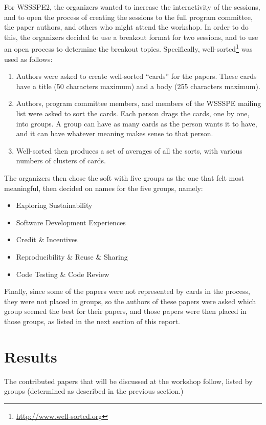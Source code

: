 \documentclass[11pt, oneside]{amsart}
\begin{document}
For WSSSPE2, the organizers wanted to increase the interactivity of the sessions, and to open the process of creating the sessions to the full program committee, the paper authors, and others who might attend the workshop.  In order to do this, the organizers decided to use a breakout format for two sessions, and to use an open process to determine the breakout topics.  Specifically, well-sorted\footnote{\url{http://www.well-sorted.org}} was used as follows:
\begin{enumerate}
\item Authors were asked to create well-sorted ``cards'' for the papers.  These cards have a title (50 characters maximum) and a body (255 characters maximum).
\item Authors, program committee members, and members of the WSSSPE mailing list were asked to sort the cards.  Each person drags the cards, one by one, into groups.  A group can have as many cards as the person wants it to have, and it can have whatever meaning makes sense to that person.
\item Well-sorted then produces a set of averages of all the sorts, with various numbers of clusters of cards.
\end{enumerate}

The organizers then chose the soft with five groups as the one that felt most meaningful, then decided on names for the five groups, namely:
\begin{itemize}
\item Exploring Sustainability
\item Software Development Experiences
\item Credit \& Incentives
\item Reproducibility \& Reuse \& Sharing
\item Code Testing \& Code Review
\end{itemize}

Finally, since some of the papers were not represented by cards in the process, they were not placed in groups, so the authors of these papers were asked which group seemed the best for their papers, and those papers were then placed in those groups, as listed in the next section of this report.


\section{Results}

The contributed papers that will be discussed at the workshop follow, listed by groups (determined as described in the previous section.)
\end{document}
